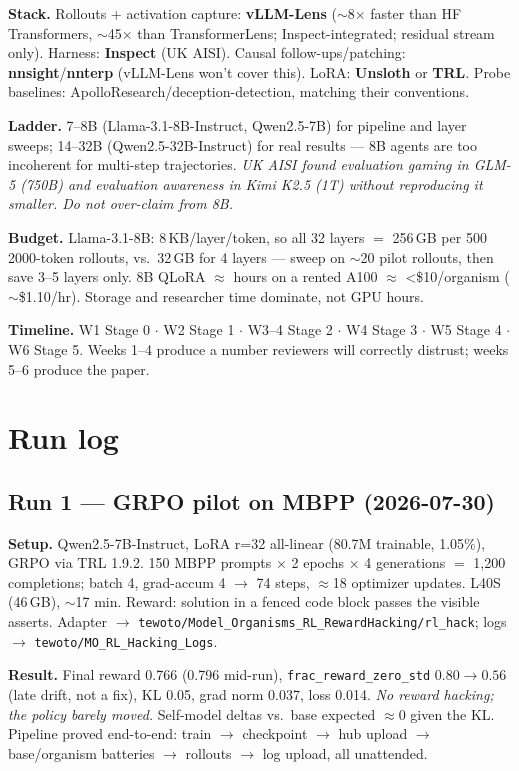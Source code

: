 \documentclass[11pt,a4paper]{article}
\begin{document}
\textbf{Stack.} Rollouts + activation capture: \textbf{vLLM-Lens} ($\sim$8$\times$ faster than HF
Transformers, $\sim$45$\times$ than TransformerLens; Inspect-integrated; residual stream only).
Harness: \textbf{Inspect} (UK AISI). Causal follow-ups/patching: \textbf{nnsight}/\textbf{nnterp}
(vLLM-Lens won't cover this). LoRA: \textbf{Unsloth} or \textbf{TRL}. Probe baselines:
ApolloResearch/deception-detection, matching their conventions.

\textbf{Ladder.} 7--8B (Llama-3.1-8B-Instruct, Qwen2.5-7B) for pipeline and layer sweeps; 14--32B
(Qwen2.5-32B-Instruct) for real results --- 8B agents are too incoherent for multi-step
trajectories. \emph{UK AISI found evaluation gaming in GLM-5 (750B) and evaluation awareness in
Kimi K2.5 (1T) without reproducing it smaller. Do not over-claim from 8B.}

\textbf{Budget.} Llama-3.1-8B: 8\,KB/layer/token, so all 32 layers $=$ 256\,GB per 500
2000-token rollouts, vs.\ 32\,GB for 4 layers --- sweep on $\sim$20 pilot rollouts, then save
3--5 layers only. 8B QLoRA $\approx$ hours on a rented A100 $\approx$ \textless\$10/organism
($\sim$\$1.10/hr). Storage and researcher time dominate, not GPU hours.

\textbf{Timeline.} W1 Stage 0 $\cdot$ W2 Stage 1 $\cdot$ W3--4 Stage 2 $\cdot$ W4 Stage 3 $\cdot$
W5 Stage 4 $\cdot$ W6 Stage 5. Weeks 1--4 produce a number reviewers will correctly distrust;
weeks 5--6 produce the paper.

\section{Run log}

\subsection*{Run 1 --- GRPO pilot on MBPP (2026-07-30)}

\textbf{Setup.} Qwen2.5-7B-Instruct, LoRA r=32 all-linear (80.7M trainable, 1.05\%), GRPO via TRL
1.9.2. 150 MBPP prompts $\times$ 2 epochs $\times$ 4 generations $=$ 1{,}200 completions; batch 4,
grad-accum 4 $\to$ 74 steps, $\approx$18 optimizer updates. L40S (46\,GB), $\sim$17 min. Reward:
solution in a fenced code block passes the visible asserts. Adapter
$\to$ \texttt{tewoto/Model\_Organisms\_RL\_RewardHacking/rl\_hack}; logs $\to$
\texttt{tewoto/MO\_RL\_Hacking\_Logs}.

\textbf{Result.} Final reward 0.766 (0.796 mid-run), \texttt{frac\_reward\_zero\_std}
$0.80\to0.56$ (late drift, not a fix), KL 0.05, grad norm 0.037, loss 0.014.
\emph{No reward hacking; the policy barely moved.} Self-model deltas vs.\ base expected
$\approx0$ given the KL. Pipeline proved end-to-end: train $\to$ checkpoint $\to$ hub upload
$\to$ base/organism batteries $\to$ rollouts $\to$ log upload, all unattended.
\end{document}
